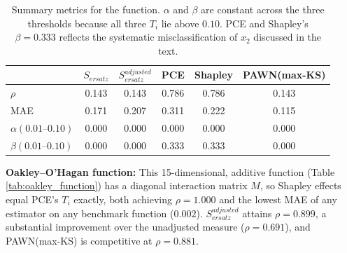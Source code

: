 \documentclass[12pt]{article}
\begin{document}
\begin{table}[H]
\centering
\begin{tabular}{@{}l|ccccc@{}} \toprule
 & $S_{ersatz}$ & $S^{adjusted}_{ersatz}$ & PCE & Shapley & PAWN(max-KS) \\ \midrule
$\rho$           & 0.143 & 0.143 & 0.786 & 0.786 & 0.143 \\
MAE              & 0.171 & 0.207 & 0.311 & 0.222 & 0.115 \\
$\alpha(0.01\text{--}0.10)$ & 0.000 & 0.000 & 0.000 & 0.000 & 0.000 \\
$\beta(0.01\text{--}0.10)$  & 0.000 & 0.000 & 0.333 & 0.333 & 0.000 \\ \bottomrule
\end{tabular}
\caption{Summary metrics for the \cite{ishigami1990importance} function. $\alpha$ and $\beta$ are constant across the three thresholds because all three $T_i$ lie above $0.10$. PCE and Shapley's $\beta=0.333$ reflects the systematic misclassification of $x_2$ discussed in the text.}
\label{tab:ishigami_summary}
\end{table}

\textbf{Oakley--O'Hagan function:} This 15-dimensional, additive function (Table \ref{tab:oakley_function}) has a diagonal interaction matrix $M$, so Shapley effects equal PCE's $T_i$ exactly, both achieving $\rho=1.000$ and the lowest MAE of any estimator on any benchmark function ($0.002$). $S^{adjusted}_{ersatz}$ attains $\rho=0.899$, a substantial improvement over the unadjusted measure ($\rho=0.691$), and PAWN(max-KS) is competitive at $\rho=0.881$.
\end{document}

